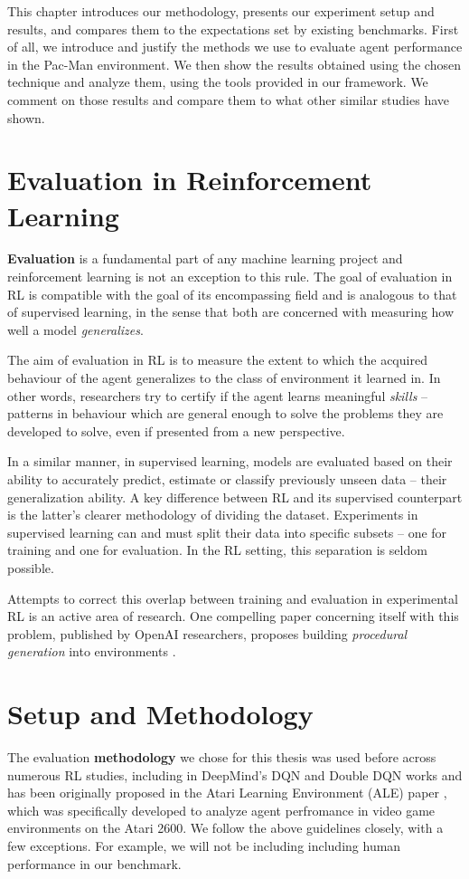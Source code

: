 This chapter introduces our methodology, presents our experiment setup and results, and compares them to the expectations set by existing benchmarks.
First of all, we introduce and justify the methods we use to evaluate agent performance in the Pac-Man environment.
We then show the results obtained using the chosen technique and analyze them, using the tools provided in our framework.
We comment on those results and compare them to what other similar studies have shown.

\section*{Evaluation in Reinforcement Learning}
\textbf{Evaluation} is a fundamental part of any machine learning project and reinforcement learning is not an exception to this rule.
The goal of evaluation in RL is compatible with the goal of its encompassing field and is analogous to that of supervised learning, in the sense that both are concerned with measuring how well a model \emph{generalizes}.

The aim of evaluation in RL is to measure the extent to which the acquired behaviour of the agent generalizes to the class of environment it learned in.
In other words, researchers try to certify if the agent learns meaningful \emph{skills} -- patterns in behaviour which are general enough to solve the problems they are developed to solve, even if presented from a new perspective.

In a similar manner, in supervised learning, models are evaluated based on their ability to accurately predict, estimate or classify previously unseen data -- their generalization ability.
A key difference between RL and its supervised counterpart is the latter's clearer methodology of dividing the dataset.
Experiments in supervised learning can and must split their data into specific subsets -- one for training and one for evaluation. In the RL setting, this separation is seldom possible.

Attempts to correct this overlap between training and evaluation in experimental RL is an active area of research.
One compelling paper concerning itself with this problem, published by OpenAI researchers, proposes building \emph{procedural generation} into environments \cite{procgen-paper}.

\section*{Setup and Methodology}
The evaluation \textbf{methodology} we chose for this thesis was used before across numerous RL studies, including in DeepMind's DQN and Double DQN works \cite{atari-dqn,ddqn-paper} and has been originally proposed in the Atari Learning Environment (ALE) paper \cite{ale-paper}, which was specifically developed to analyze agent perfromance in video game environments on the Atari 2600.
We follow the above guidelines closely, with a few exceptions.
For example, we will not be including including human performance in our benchmark.

